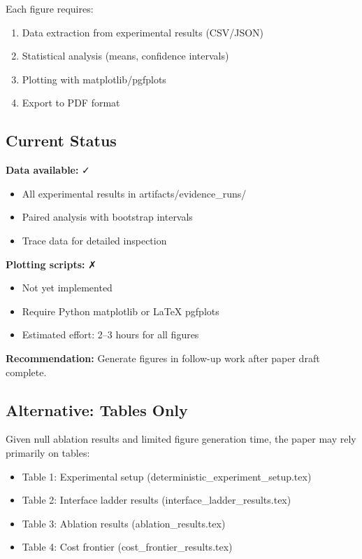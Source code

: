 Each figure requires:
\begin{enumerate}
    \item Data extraction from experimental results (CSV/JSON)
    \item Statistical analysis (means, confidence intervals)
    \item Plotting with matplotlib/pgfplots
    \item Export to PDF format
\end{enumerate}

\subsection{Current Status}

\textbf{Data available:} ✓
\begin{itemize}
    \item All experimental results in artifacts/evidence\_runs/
    \item Paired analysis with bootstrap intervals
    \item Trace data for detailed inspection
\end{itemize}

\textbf{Plotting scripts:} ✗
\begin{itemize}
    \item Not yet implemented
    \item Require Python matplotlib or LaTeX pgfplots
    \item Estimated effort: 2--3 hours for all figures
\end{itemize}

\textbf{Recommendation:} Generate figures in follow-up work after paper draft complete.

\subsection{Alternative: Tables Only}

Given null ablation results and limited figure generation time, the paper may rely primarily on tables:

\begin{itemize}
    \item Table 1: Experimental setup (deterministic\_experiment\_setup.tex)
    \item Table 2: Interface ladder results (interface\_ladder\_results.tex)
    \item Table 3: Ablation results (ablation\_results.tex)
    \item Table 4: Cost frontier (cost\_frontier\_results.tex)
\end{itemize}


